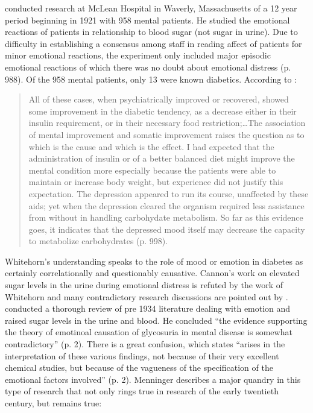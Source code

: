 \documentclass[12pt]{article}
\begin{document}
\citet{whitehorn_blood_1934} conducted research at McLean Hospital in Waverly, Massachusetts of a 12 year period beginning in 1921 with 958 mental patients. He studied the emotional reactions of patients in relationship to blood sugar (not sugar in urine). Due to difficulty in establishing a consensus among staff in reading affect of patients for minor emotional reactions, the experiment only included major episodic emotional reactions of which there was no doubt about emotional distress (p. 988). Of the 958 mental patients, only 13 were known diabetics. According to \citet{whitehorn_blood_1934}:
\begin{singlespace}
  \begin{quote}
  All of these cases, when psychiatrically improved or recovered, showed some improvement in the diabetic tendency, as a decrease either in their insulin requirement, or in their necessary food restriction;\dots The association of mental improvement and somatic improvement raises the question as to which is the cause and which is the effect. I had expected that the administration of insulin or of a better balanced diet might improve the mental condition more especially because the patients were able to maintain or increase body weight, but experience did not justify this expectation. The depression appeared to run its course, unaffected by these aids; yet when the depression cleared the organism required less assistance from without in handling carbohydate metabolism. So far as this evidence goes, it indicates that the depressed mood itself may decrease the capacity to metabolize carbohydrates (p. 998).
    \end{quote} 
\end{singlespace}
Whitehorn's understanding speaks to the role of mood or emotion in diabetes as certainly correlationally and questionably causative. Cannon's work \citep{Cannon_emotional_1911} on elevated sugar levels in the urine during emotional distress is refuted by the work of Whitehorn and many contradictory research discussions are pointed out by \citet{bowman_sugar_1929} \citep{stragnell_1921_relationship, miles_1922_psychologic, masson_1923_mental, neilson_1927_emotional}. 
\citet{menninger_1935_psychological} conducted a thorough review of pre 1934 literature dealing with emotion and raised sugar levels in the urine and blood. He concluded ``the evidence supporting the theory of emotinoal causation of glycosuria in mental disease is somewhat contradictory'' (p. 2). There is a great confusion, which states ``arises in the interpretation of these various findings, not because of their very excellent chemical studies, but because of the vagueness of the specification of the emotional factors involved'' (p. 2). Menninger describes a major quandry in this type of research that not only rings true in research of the early twentieth century, but remains true: 
\end{document}
